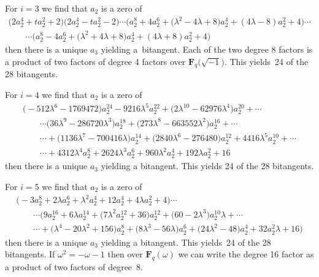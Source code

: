 \documentclass[pdftex]{sigma}
\numberwithin{equation}{section}
\begin{document}
 For $i=3$ we f\/ind that $a_2$ is a zero of
\begin{gather*}
\big(2a_2^4+ta_2^2+2\big)\big(2a_2^4-ta_2^2-2\big) \cdots \big(a_2^8+4a_2^6+\big( \lambda^2-4\lambda+8\big)a_2^4+(4\lambda-8)a_2^2+4\big) \cdots \\ \qquad{} \cdots \big(a_2^8-4a_2^6+\big( \lambda^2+4\lambda+8\big)a_2^4+(4\lambda+8)a_2^2+4\big) \end{gather*}
then there is a unique $a_3$ yielding a~bitangent. Each of the two degree 8 factors is a product of two factors of degree 4 factors over $\mathbf{F}_q\big(\sqrt{-1}\big)$. This yields~24 of the 28 bitangents.

For $i=4$ we f\/ind that $a_2$ is a zero of
 \begin{gather*}
\big({-}512\lambda^{6}-1769472\big)a_2^{24}-9216\lambda^{5}a_2^{22} +\big(2\lambda^{10}-62976\lambda^{4}\big)a_2^{20}+ \cdots \\
\qquad{} \cdots \big(36\lambda^{9}-286720\lambda^{3}\big)a_2^{18}+\big(273\lambda^{8}-663552\lambda^{2}\big)a_2^{16}+ \cdots \\
\qquad{} \cdots +\big(1136\lambda^{7}-700416\lambda\big)a_2^{14} +\big(2840\lambda^{6}-276480\big)a_2^{12}+4416\lambda^{5} a_2^{10}+ \cdots \\
\qquad {}\cdots +4312\lambda^{4} a_2^8+2624\lambda^{3}a_2^6+960\lambda^{2}a_2^4+192\lambda a_2^2+16\end{gather*}
 then there is a unique $a_3$ yielding a bitangent. This yields 24 of the 28 bitangents.

For $i=5$ we f\/ind that $a_2$ is a zero of
 \begin{gather*} \big({-}3a_2^8+2\lambda a_2^6 +\lambda^2 a_2^4+12a_2^4+4\lambda a_2^2+4\big) \cdots \\
 \qquad{} \cdots \big(9a_2^{16}+6\lambda a_2^{14} +\big(7\lambda^2 a_2^{12}+36\big)a_2^{12}+\big(60-2\lambda^3\big)a_2^{10}\lambda + \cdots \\
 \qquad{} \cdots +\big(\lambda^4-20\lambda^2+156\big)a_2^8+\big(8\lambda^3-56\lambda\big)a_2^6 +\big(24\lambda^2-48\big)a_2^4+32a_2^2\lambda +16\big) \end{gather*}
then there is a unique $a_3$ yielding a bitangent. This yields~24 of the 28 bitangents. If $\omega^2=-\omega-1$ then over $\mathbf{F}_q(\omega)$ we can write the degree 16 factor as a product of two factors of degree~8.
\end{document}
